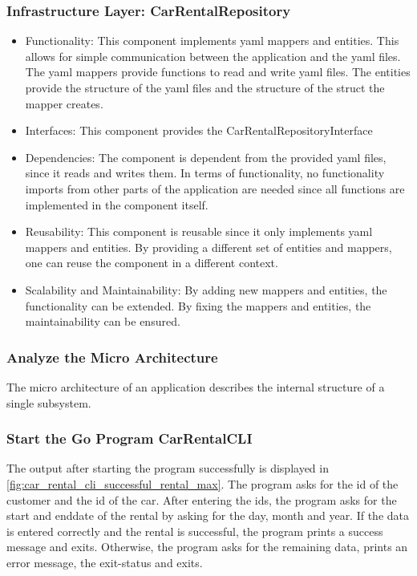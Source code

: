 \subsubsection*{Infrastructure Layer: CarRentalRepository}
\begin{itemize}
    \item Functionality: This component implements yaml mappers and entities. 
          This allows for simple communication between the application and the yaml files.
          The yaml mappers provide functions to read and write yaml files.
          The entities provide the structure of the yaml files and the structure of the struct the mapper creates.
    \item Interfaces: This component provides the CarRentalRepositoryInterface
    \item Dependencies: The component is dependent from the provided yaml files, since it reads and writes them.
          In terms of functionality, no functionality imports from other parts of the application are needed since all functions are implemented in the component itself.
    \item Reusability: This component is reusable since it only implements yaml mappers and entities.
          By providing a different set of entities and mappers, one can reuse the component in a different context.
    \item Scalability and Maintainability: By adding new mappers and entities, the functionality can be extended.
          By fixing the mappers and entities, the maintainability can be ensured.
\end{itemize}

\subsubsection*{Analyze the Micro Architecture}
The micro architecture of an application describes the internal structure of a single subsystem.


\subsubsection*{Start the Go Program CarRentalCLI}
The output after starting the program successfully is displayed in \autoref{fig:car_rental_cli_successful_rental_max}.
The program asks for the id of the customer and the id of the car.
After entering the ids, the program asks for the start and enddate of the rental by asking for the day, month and year.
If the data is entered correctly and the rental is successful, the program prints a success message and exits.
Otherwise, the program asks for the remaining data, prints an error message, the exit-status and exits.

